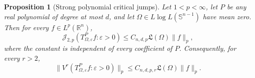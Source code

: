 \documentclass[11pt]{article}
\numberwithin{equation}{section}
\newtheorem{proposition}[theorem]{Proposition}
\theoremstyle{remark}
\theoremstyle{definition}
\newcommand{\R}{\mathbb R}
\newcommand{\Sph}{\mathbb S}
\newcommand{\norm}[1]{\lVert #1\rVert}
\newcommand{\Jop}[1]{\mathcal J_{2,#1}}
\begin{document}
\begin{proposition}[Strong polynomial critical jumps]
\label{prop:strong-polynomial-jump}
Let \(1<p<\infty\), let \(P\) be any real polynomial of degree at most
\(d\), and let \(\Omega\in L\log L(\Sph^{n-1})\) have mean zero.  Then
for every $f\in L^p(\R^n)$,
\begin{equation}\label{eq:strong-polynomial-jump}
 \Jop{p}(T^P_{\Omega,\varepsilon}f:\varepsilon>0)
 \leq C_{n,d,p}\mathfrak L(\Omega)\norm f_p,
\end{equation}
where the constant is independent of every coefficient of \(P\).
Consequently, for every \(r>2\),
\begin{equation}\label{eq:strong-polynomial-variation}
 \norm{V^r(T^P_{\Omega,\varepsilon}f:\varepsilon>0)}_p
 \leq C_{n,d,p,r}\mathfrak L(\Omega)\norm f_p.
\end{equation}
\end{proposition}
\end{document}
